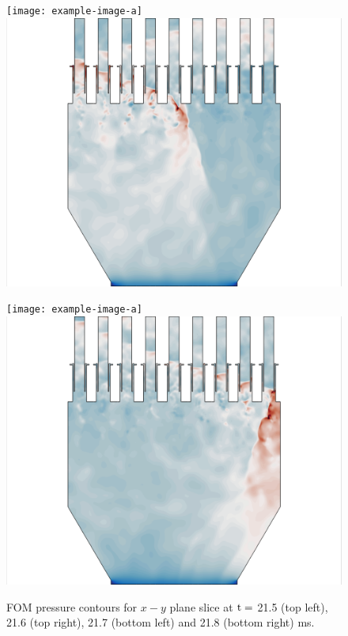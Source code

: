 \begin{figure}
	\begin{minipage}{0.49\linewidth}
		\ifdefined\DRAFT
			\texttt{[image: example-image-a]}
		\else
			\includegraphics[width=0.99\linewidth,trim={0.5em 0em 6cm 0em},clip]{Chapters/NineElement/Images/example_snaps/example_pressure_z_217000.png}
		\fi
	\end{minipage}
	\begin{minipage}{0.49\linewidth}
		\ifdefined\DRAFT
			\texttt{[image: example-image-a]}
		\else
			\includegraphics[width=0.99\linewidth,trim={6cm 0em 0.5em 0em},clip]{Chapters/NineElement/Images/example_snaps/example_pressure_z_218000.png}
		\fi
	\end{minipage}
	\caption{\label{fig:nineElemFOMPressure}FOM pressure contours for $x-y$ plane slice at $\text{t} = $ 21.5 (top left), 21.6 (top right), 21.7 (bottom left) and 21.8 (bottom right) ms.}
\end{figure}

